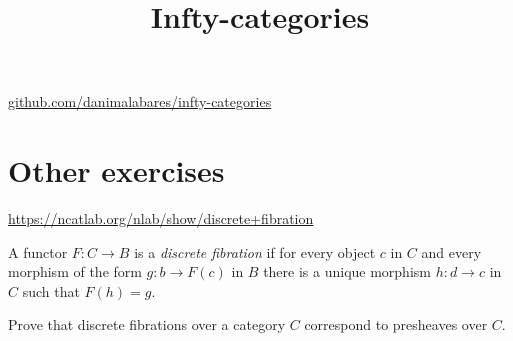 



\title{Infty-categories}
\maketitle

\label{section-phantom}
\hfill
\href{http://github.com/danimalabares/infty-categories}
{github.com/danimalabares/infty-categories}

\tableofcontents

\section{Other exercises}
\label{section-other-exercises}

\begin{definition}
\label{definition-discrete-fibration}
\begin{reference}
\url{https://ncatlab.org/nlab/show/discrete+fibration} 
\end{reference}
A functor $F:C \to B$ is a {\it discrete fibration} if for every object
$c$ in $C$ and every morphism of the form $g: b \to F(c)$ in $B$ 
there is a unique morphism $h:d \to c$ in $C$ 
such that $F(h)=g$.
\end{definition}

\begin{exercise}
\label{exercise-discrete-fibrations-over-category-are-presheaves}
Prove that discrete fibrations over a category $C$ correspond to presheaves over
$C$.
\end{exercise}

